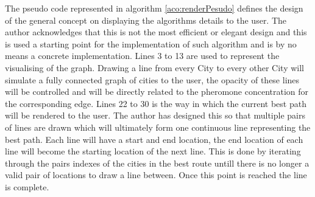 The pseudo code represented in algorithm \ref{aco:renderPesudo} defines the design of the general concept on displaying the algorithms details to the user. The author acknowledges that this is not the most efficient or elegant design and this is used a starting point for the implementation of such algorithm and is by no means a concrete implementation. Lines 3 to 13 are used to represent the visualising of the graph. Drawing a line from every City to every other City will simulate a fully connected graph of cities to the user, the opacity of these lines will be controlled and will be directly related to the pheromone concentration for the corresponding edge. Lines 22 to 30 is the way in which the current best path will be rendered to the user. The author has designed this so that multiple pairs of lines are drawn which will ultimately form one continuous line representing the best path. Each line will have a start and end location, the end location of each line will become the starting location of the next line. This is done by iterating through the pairs indexes of the cities in the best route untill there is no longer a valid pair of locations to draw a line between. Once this point is reached the line is complete.



